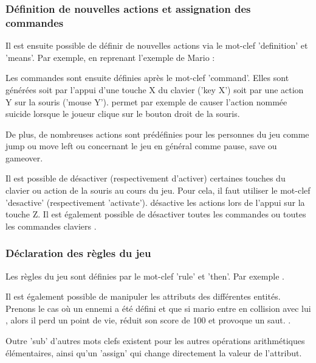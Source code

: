 \subsubsection{Définition de nouvelles actions et assignation des commandes}

Il est ensuite possible de définir de nouvelles actions via le mot-clef 'definition' et 'means'.
Par exemple, en reprenant l'exemple de Mario : 

Les commandes sont ensuite définies après le mot-clef 'command'. Elles sont générées soit par l'appui d'une touche X du clavier ('key X') soit par 
une action Y sur la souris ('mouse Y').
 permet par exemple de causer l'action nommée suicide lorsque le joueur clique sur le bouton droit de la souris.

De plus, de nombreuses actions sont prédéfinies pour les personnes du jeu comme jump ou move left ou concernant le jeu en général comme pause, save ou gameover.
 

Il est possible de désactiver (respectivement d'activer) certaines touches du clavier ou action de la souris au cours du jeu.
Pour cela, il faut utiliser le mot-clef 'desactive' (respectivement 'activate').
 désactive les actions lors de l'appui sur la touche Z.
Il est également possible de désactiver toutes les commandes  ou toutes les commandes claviers .

\subsubsection{Déclaration des règles du jeu}

Les règles du jeu sont définies par le mot-clef 'rule' et 'then'.
Par exemple .

Il est également possible de manipuler les attributs des différentes entités. Prenons le cas où un ennemi a été défini 
et que si mario entre en collision avec lui , alors il perd un point de vie, réduit son score de 100 et provoque un saut.
 .

Outre 'sub' d'autres mots clefs existent pour les autres opérations arithmétiques élémentaires, ainsi qu'un 'assign' qui change directement
la valeur de l'attribut.

